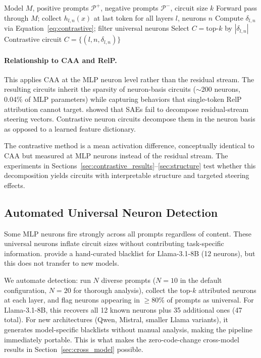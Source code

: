 \documentclass[11pt]{article}
\begin{document}
\begin{algorithm}[h]
\caption{Contrastive Neuron Discovery}
\label{alg:contrastive}
\begin{algorithmic}[1]
\REQUIRE Model $M$, positive prompts $\mathcal{P}^+$, negative prompts $\mathcal{P}^-$, circuit size $k$
    \STATE Forward pass through $M$; collect $h_{l,n}(x)$ at last token for all layers $l$, neurons $n$
\ENDFOR
\STATE Compute $\delta_{l,n}$ via Equation~\ref{eq:contrastive}; filter universal neurons
\STATE Select $C = \text{top-}k$ by $|\delta_{l,n}|$
\RETURN Contrastive circuit $C = \{(l, n, \delta_{l,n})\}$
\end{algorithmic}
\end{algorithm}

\paragraph{Relationship to CAA and RelP.}
This applies CAA at the MLP neuron level rather than the residual stream.
The resulting circuits inherit the sparsity of neuron-basis circuits (${\sim}$200 neurons, 0.04\% of MLP parameters) while capturing behaviors that single-token RelP attribution cannot target.
\citet{mayne2024sae_steering} showed that SAEs fail to decompose residual-stream steering vectors. Contrastive neuron circuits decompose them in the neuron basis as opposed to a learned feature dictionary.

The contrastive method is a mean activation difference, conceptually identical to CAA but measured at MLP neurons instead of the residual stream.
The experiments in Sections~\ref{sec:contrastive_results}--\ref{sec:structure} test whether this decomposition yields circuits with interpretable structure and targeted steering effects.

\subsection{Automated Universal Neuron Detection}
\label{sec:blacklist}

Some MLP neurons fire strongly across all prompts regardless of content.
These universal neurons inflate circuit sizes without contributing task-specific information.
\citet{arora2025circuits} provide a hand-curated blacklist for Llama-3.1-8B (12 neurons), but this does not transfer to new models.

We automate detection: run $N$ diverse prompts ($N{=}10$ in the default configuration, $N{=}20$ for thorough analysis), collect the top-$k$ attributed neurons at each layer, and flag neurons appearing in $\geq$80\% of prompts as universal.
For Llama-3.1-8B, this recovers all 12 known neurons plus 35 additional ones (47 total).
For new architectures (Qwen, Mistral, smaller Llama variants), it generates model-specific blacklists without manual analysis, making the pipeline immediately portable.
This is what makes the zero-code-change cross-model results in Section~\ref{sec:cross_model} possible.
\end{document}
